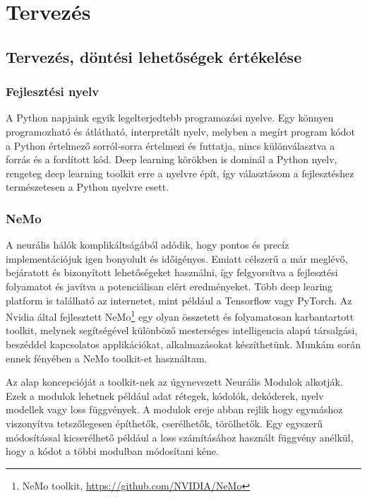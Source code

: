 \chapter{Tervezés}

\section{Tervezés, döntési lehetőségek értékelése}

\subsection{Fejlesztési nyelv}

A Python napjaink egyik legelterjedtebb programozási nyelve. Egy könnyen programozható és átlátható, interpretált nyelv, melyben a megírt program kódot a Python értelmező sorról-sorra értelmezi és futtatja, nincs különválasztva a forrás és a fordított kód. Deep learning körökben is dominál a Python nyelv, rengeteg deep learning toolkit erre a nyelvre épít, így választásom a fejlesztéshez természetesen a Python nyelvre esett.

\subsection{NeMo}

A neurális hálók komplikáltságából adódik, hogy pontos és precíz implementációjuk igen bonyolult és időigényes. Emiatt célszerű a már meglévő, bejáratott és bizonyított lehetőségeket használni, így felgyorsítva a fejlesztési folyamatot és javítva a potenciálisan elért eredményeket. Több deep learing platform is található az internetet, mint például a Tensorflow vagy PyTorch. Az Nvidia által fejlesztett NeMo\footnote{NeMo toolkit, \url{https://github.com/NVIDIA/NeMo}} egy olyan összetett és folyamatosan karbantartott toolkit, melynek segítségével különböző mesterséges intelligencia alapú társalgási, beszéddel kapcsolatos applikációkat, alkalmazásokat készíthetünk. Munkám során ennek fényében a NeMo toolkit-et használtam.

Az alap koncepcióját a toolkit-nek az úgynevezett Neurális Modulok alkotják. Ezek a modulok lehetnek például adat rétegek, kódolók, dekóderek, nyelv modellek vagy loss függvények. A modulok ereje abban rejlik hogy egymáshoz viszonyítva tetszőlegesen építhetők, cserélhetők, törölhetők. Egy egyszerű módosítással kicserélhető például a loss számításához használt függvény anélkül, hogy a kódot a többi modulban módosítani kéne.

